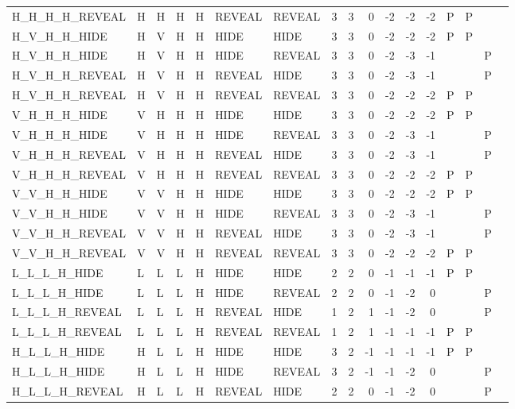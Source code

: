 \begin{longtable}{lllllllrrrrrrllll}
  H\_H\_H\_H\_REVEAL & H & H & H & H & REVEAL & REVEAL & 3 & 3 & 0 & -2 & -2 & -2 & P & P &  &  \\ 
  H\_V\_H\_H\_HIDE & H & V & H & H & HIDE & HIDE & 3 & 3 & 0 & -2 & -2 & -2 & P & P &  &  \\ 
  H\_V\_H\_H\_HIDE & H & V & H & H & HIDE & REVEAL & 3 & 3 & 0 & -2 & -3 & -1 &  &  & P &  \\ 
  H\_V\_H\_H\_REVEAL & H & V & H & H & REVEAL & HIDE & 3 & 3 & 0 & -2 & -3 & -1 &  &  & P &  \\ 
  H\_V\_H\_H\_REVEAL & H & V & H & H & REVEAL & REVEAL & 3 & 3 & 0 & -2 & -2 & -2 & P & P &  &  \\ 
  V\_H\_H\_H\_HIDE & V & H & H & H & HIDE & HIDE & 3 & 3 & 0 & -2 & -2 & -2 & P & P &  &  \\ 
  V\_H\_H\_H\_HIDE & V & H & H & H & HIDE & REVEAL & 3 & 3 & 0 & -2 & -3 & -1 &  &  & P &  \\ 
  V\_H\_H\_H\_REVEAL & V & H & H & H & REVEAL & HIDE & 3 & 3 & 0 & -2 & -3 & -1 &  &  & P &  \\ 
  V\_H\_H\_H\_REVEAL & V & H & H & H & REVEAL & REVEAL & 3 & 3 & 0 & -2 & -2 & -2 & P & P &  &  \\ 
  V\_V\_H\_H\_HIDE & V & V & H & H & HIDE & HIDE & 3 & 3 & 0 & -2 & -2 & -2 & P & P &  &  \\ 
  V\_V\_H\_H\_HIDE & V & V & H & H & HIDE & REVEAL & 3 & 3 & 0 & -2 & -3 & -1 &  &  & P &  \\ 
  V\_V\_H\_H\_REVEAL & V & V & H & H & REVEAL & HIDE & 3 & 3 & 0 & -2 & -3 & -1 &  &  & P &  \\ 
  V\_V\_H\_H\_REVEAL & V & V & H & H & REVEAL & REVEAL & 3 & 3 & 0 & -2 & -2 & -2 & P & P &  &  \\ 
  L\_L\_L\_H\_HIDE & L & L & L & H & HIDE & HIDE & 2 & 2 & 0 & -1 & -1 & -1 & P & P &  &  \\ 
  L\_L\_L\_H\_HIDE & L & L & L & H & HIDE & REVEAL & 2 & 2 & 0 & -1 & -2 & 0 &  &  & P &  \\ 
  L\_L\_L\_H\_REVEAL & L & L & L & H & REVEAL & HIDE & 1 & 2 & 1 & -1 & -2 & 0 &  &  & P &  \\ 
  L\_L\_L\_H\_REVEAL & L & L & L & H & REVEAL & REVEAL & 1 & 2 & 1 & -1 & -1 & -1 & P & P &  &  \\ 
  H\_L\_L\_H\_HIDE & H & L & L & H & HIDE & HIDE & 3 & 2 & -1 & -1 & -1 & -1 & P & P &  &  \\ 
  H\_L\_L\_H\_HIDE & H & L & L & H & HIDE & REVEAL & 3 & 2 & -1 & -1 & -2 & 0 &  &  & P &  \\ 
  H\_L\_L\_H\_REVEAL & H & L & L & H & REVEAL & HIDE & 2 & 2 & 0 & -1 & -2 & 0 &  &  & P &  \\ 

\end{longtable}
